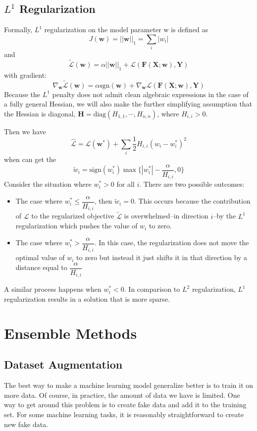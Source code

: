 \documentclass{article}
\begin{document}
		\subsection{$L^1$ Regularization}
		Formally, $L^1$	regularization on the model parameter w is defined as
		$$
		J(\bm w) = ||\bm w||_1 = \sum_i|w_i|
		$$
		and
		$$
		\tilde{\mathcal{L}}(\bm w) =\alpha ||\bm w||_1 + \mathcal L(\bm F(\bm X;\bm w),\bm Y)
		$$
		with gradient:
		$$
		\nabla_{\bm w}\tilde{\mathcal{L}}(\bm w) =\alpha \text{sgn}(\bm w) + \nabla_{\bm w} \mathcal L(\bm F(\bm X;\bm w),\bm Y)
		$$
			Because the $L^1$ penalty does not admit clean algebraic expressions in the case
			of a fully general Hessian, we will also make the further simplifying assumption
			that the Hessian is diagonal, $\bm H =\text{diag}(H_{1,1},\cdots,H_{n,n})$, where $H_{i,i}>0$.
			
			Then we have 			
			$$
			\hat{\mathcal{L}} = \mathcal{L}(\bm w^*) +\sum_i \dfrac{1}{2}H_{i,i}(w_i - w_i^*)^2
			$$
			when can get the
			$$
			\tilde w_i =\text{sign}(w_i^*)\max \{|w_i^*|-\dfrac{\alpha}{H_{i,i}},0 \}
			$$
		Consider the situation where $w^*_i>0$ for all $i$. There are two possible outcomes:
			\begin{itemize}
				\item The case where $ w^*_i\leq\dfrac{\alpha}{H_{i,i}}$, then $\tilde{w}_i=0$.  This occurs because the contribution of $\mathcal{L}$ to the regularized objective $\tilde{\mathcal L}$ is overwhelmed--in direction $i$--by the $L^1$ regularization which pushes the value of $w_i$ to zero.
				
				\item The case where $ w^*_i >\dfrac{\alpha}{H_{i,i}}$.  In this case, the regularization does not move the optimal value of $w_i$ to zero but instead it just shifts it in that direction by a distance equal to $\dfrac{\alpha}{H_{i,i}}$
			\end{itemize}
			A similar process happens when $w^*_i<0$.
			In comparison to $L^2$ regularization, $L^1$ regularization results in a solution that is more sparse.
	
	\section{Ensemble Methods}
	\subsection{Dataset Augmentation}
		The best way to make a machine learning model generalize better is to train it on
	more data. Of course, in practice, the amount of data we have is limited. One way
	to get around this problem is to create fake data and add it to the training set.
	For some machine learning tasks, it is reasonably straightforward to create new
	fake data.
	
\end{document}
